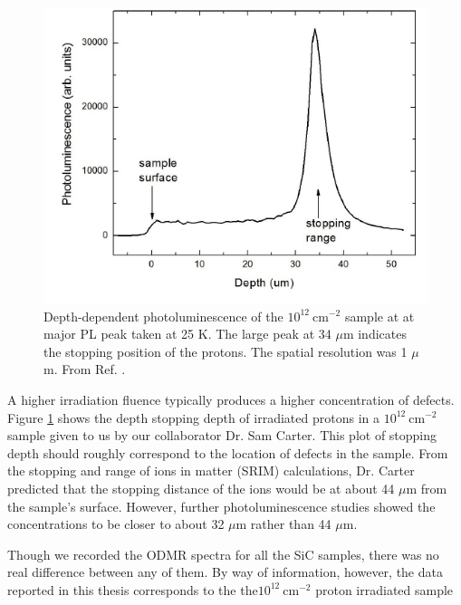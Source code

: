 \documentclass[oneside]{BYUPhys}
\begin{document}
\begin{figure}[t]
    \centerline{\includegraphics{srim_fig}}
    \caption[SiC Depth-Dependent Photoluminescence]{\label{fig:SiCDepth}
     Depth-dependent photoluminescence of the $10^{12}~\text{cm}^{−2}$ sample at at major PL peak taken at 25 K. The large peak at 34 $\mu$m indicates the stopping position of the protons. The spatial resolution was 1 $\mu$m. From Ref. .}
 \end{figure}

A higher irradiation fluence typically produces a higher concentration of defects. Figure \ref{fig:SiCDepth} shows the depth stopping depth of irradiated protons in a $10^{12}~\text{cm}^{-2}$ sample given to us by our collaborator Dr. Sam Carter. This plot of stopping depth should roughly correspond to the location of defects in the sample. From the stopping and range of ions in matter (SRIM) calculations, Dr. Carter predicted that the stopping distance of the ions would be at about 44 $\mu$m from the sample's surface. However, further photoluminescence studies showed the concentrations to be closer to about 32 $\mu$m rather than 44 $\mu$m. 

Though we recorded the ODMR spectra for all the SiC samples, there was no real difference between any of them. By way of information, however, the data reported in this thesis corresponds to the the$10^{12}~\text{cm}^{-2}$ proton irradiated sample
\end{document}
